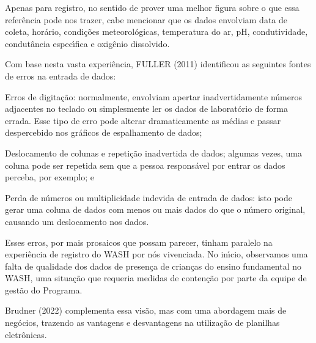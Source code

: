 \documentclass[
12pt,		%
openright,	%
twoside,  %
a4paper,			%
chapter=TITLE,		%
english,			%
french,				%
spanish,			%
brazil				%
]{USPSC-classe/USPSC}
\begin{document}
Apenas para registro, no sentido de prover uma melhor figura sobre o que essa refer\^encia pode nos trazer, cabe mencionar que os dados envolviam data de coleta, hor\'ario, condi\c{c}\~oes meteorol\'ogicas, temperatura do ar, pH, condutividade, condut\^ancia espec\'{\i}fica e oxig\^enio dissolvido.








Com base nesta vasta experi\^encia,  FULLER (2011) identificou as seguintes fontes de erros na entrada de dados:









\begin{alineas}
\item Erros de digita\c{c}\~ao: normalmente, envolviam apertar inadvertidamente n\'umeros adjacentes no teclado ou simplesmente ler os dados de laborat\'orio de forma errada. Esse tipo de erro pode alterar dramaticamente as m\'edias e passar despercebido nos gr\'aficos de espalhamento de dados;
\item Deslocamento de colunas e repeti\c{c}\~ao inadvertida de dados; algumas vezes, uma coluna pode ser repetida sem que a pessoa respons\'avel por entrar os dados perceba, por exemplo; e
\item Perda de n\'umeros ou multiplicidade indevida de entrada de dados: isto pode gerar uma coluna de dados com menos ou mais dados do que o n\'umero original, causando um deslocamento nos dados.
\end{alineas}

Esses erros, por mais prosaicos que possam parecer, tinham paralelo na experi\^encia de registro do WASH por n\'os vivenciada. No in\'{\i}cio, observamos uma falta de qualidade dos dados de presen\c{c}a de crian\c{c}as do ensino fundamental no WASH, uma situa\c{c}\~ao que requeria medidas de conten\c{c}\~ao por parte da equipe de gest\~ao do Programa.








 Brudner (2022) complementa essa vis\~ao, mas com uma abordagem mais de neg\'ocios, trazendo as vantagens e desvantagens na utiliza\c{c}\~ao de planilhas eletr\^onicas.
\end{document}
